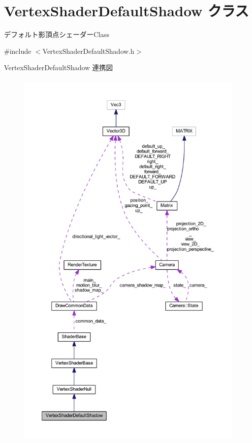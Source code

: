 \hypertarget{class_vertex_shader_default_shadow}{}\section{Vertex\+Shader\+Default\+Shadow クラス}
\label{class_vertex_shader_default_shadow}


デフォルト影頂点シェーダー\+Class  




{\ttfamily \#include $<$Vertex\+Shader\+Default\+Shadow.\+h$>$}



Vertex\+Shader\+Default\+Shadow 連携図\nopagebreak
\begin{figure}[H]
\begin{center}
\leavevmode
\includegraphics[height=550pt]{class_vertex_shader_default_shadow__coll__graph}
\end{center}
\end{figure}
